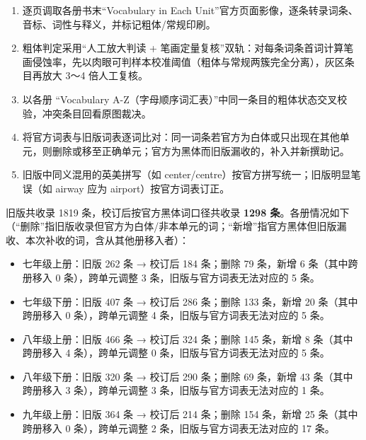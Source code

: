 \documentclass[UTF8,a4paper,11pt,oneside]{ctexbook}
\begin{document}
\vspace{0.12em}\noindent{\color{rulelight}\rule{\linewidth}{0.55pt}}\par
\addvspace{0.2em}
\begin{enumerate}[leftmargin=2.4em,itemsep=0.25ex,topsep=0.3ex,label={\textcolor{mainblue}{\arabic*.}}]
\item 逐页调取各册书末“Vocabulary in Each Unit”官方页面影像，逐条转录词条、音标、词性与释义，并标记粗体/常规印刷。
\item 粗体判定采用“人工放大判读 + 笔画定量复核”双轨：对每条词条首词计算笔画侵蚀率，先以肉眼可判样本校准阈值（粗体与常规两簇完全分离），灰区条目再放大 3～4 倍人工复核。
\item 以各册 “Vocabulary A-Z（字母顺序词汇表）”中同一条目的粗体状态交叉校验，冲突条目回看原图裁决。
\item 将官方词表与旧版词表逐词比对：同一词条若官方为白体或只出现在其他单元，则删除或移至正确单元；官方为黑体而旧版漏收的，补入并新撰助记。
\item 旧版中同义混用的英美拼写（如 center/centre）按官方拼写统一；旧版明显笔误（如 airway 应为 airport）按官方词表订正。
\end{enumerate}
\par\addvspace{0.75em}\par
\vspace{0.12em}\noindent{\color{rulelight}\rule{\linewidth}{0.55pt}}\par
\addvspace{0.2em}
旧版共收录 1819 条，校订后按官方黑体词口径共收录 \textbf{\textcolor{mainblue}{1298 条}}。各册情况如下（“删除”指旧版收录但官方为白体/非本单元的词；“新增”指官方黑体但旧版漏收、本次补收的词，含从其他册移入者）：\par
\begin{itemize}[leftmargin=2.2em,itemsep=0.25ex,topsep=0.3ex,label={\textcolor{mainblue}{\small\textbullet}}]
\item 七年级上册：旧版 262 条 → 校订后 184 条；删除 79 条，新增 6 条（其中跨册移入 0 条），跨单元调整 3 条，旧版与官方词表无法对应的 5 条。
\item 七年级下册：旧版 407 条 → 校订后 286 条；删除 133 条，新增 20 条（其中跨册移入 0 条），跨单元调整 4 条，旧版与官方词表无法对应的 5 条。
\item 八年级上册：旧版 466 条 → 校订后 324 条；删除 145 条，新增 8 条（其中跨册移入 4 条），跨单元调整 0 条，旧版与官方词表无法对应的 5 条。
\item 八年级下册：旧版 320 条 → 校订后 290 条；删除 69 条，新增 43 条（其中跨册移入 3 条），跨单元调整 3 条，旧版与官方词表无法对应的 1 条。
\item 九年级上册：旧版 364 条 → 校订后 214 条；删除 154 条，新增 25 条（其中跨册移入 0 条），跨单元调整 2 条，旧版与官方词表无法对应的 17 条。
\end{itemize}
\end{document}
